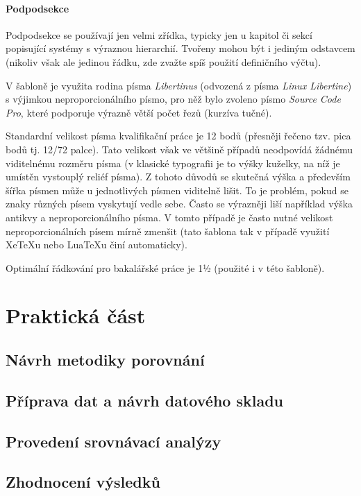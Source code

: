 \documentclass[male,czech,api_bc]{kitheses}
\begin{document}
\subsubsection{Podpodsekce}
Podpodsekce se používají jen velmi zřídka, typicky jen u kapitol či sekcí popisující systémy s výraznou hierarchií. Tvořeny mohou být i jediným odstavcem (nikoliv však ale jedinou řádku, zde zvažte spíš použití definičního výčtu).


V šabloně je využita rodina písma \textit{Libertinus} (odvozená z písma \textit{Linux Libertine}) s výjimkou neproporcionálního písmo, pro něž bylo zvoleno písmo \textit{Source Code Pro}, které podporuje výrazně větší počet řezů (kurzíva tučné).

Standardní velikost písma kvalifikační práce je 12 bodů (přesněji řečeno tzv. pica bodů tj. 12/72 palce). Tato velikost však ve většině případů neodpovídá žádnému viditelnému rozměru písma (v klasické typografii je to výšky kuželky, na níž je umístěn vystouplý reliéf písma). Z  tohoto důvodů se skutečná výška a především šířka písmen může u jednotlivých písmen viditelně lišit. To je problém, pokud se znaky různých písem vyskytují vedle sebe. Často se výrazněji liší například výška antikvy a  neproporcionálního písma. V tomto případě je často nutné velikost neproporcionálních písem mírně zmenšit (tato šablona tak v případě využití XeTeXu nebo LuaTeXu činí automaticky).

Optimální řádkování pro bakalářské práce je 1½ (použité i v této šabloně).



\chapter{Praktická část}

\section{Návrh metodiky porovnání}
\section{Příprava dat a návrh datového skladu}
\section{Provedení srovnávací analýzy}
\section{Zhodnocení výsledků}
\end{document}
